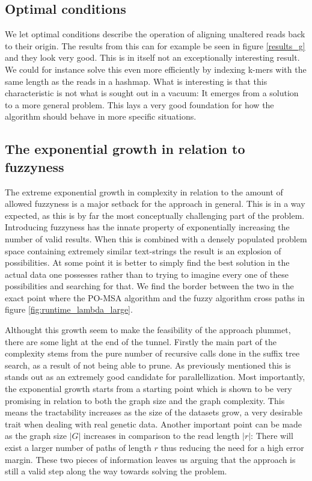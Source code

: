 \documentclass[thesis.tex]{subfiles}
\begin{document}
\subsection*{Optimal conditions}
We let optimal conditions describe the operation of aligning unaltered reads back to their origin. The results from this can for example be seen in figure \ref{results_g} and they look very good. This is in itself not an exceptionally interesting result. We could for instance solve this even more efficiently by indexing k-mers with the same length as the reads in a hashmap. What is interesting is that this characteristic is not what is sought out in a vacuum: It emerges from a solution to a more general problem. This lays a very good foundation for how the algorithm should behave in more specific situations. 
\subsection*{The exponential growth in relation to fuzzyness}
The extreme exponential growth in complexity in relation to the amount of allowed fuzzyness is a major setback for the approach in general. This is in a way expected, as this is by far the most conceptually challenging part of the problem. Introducing fuzzyness has the innate property of exponentially increasing the number of valid results. When this is combined with a densely populated problem space containing extremely similar text-strings the result is an explosion of possibilities. At some point it is better to simply find the best solution in the actual data one possesses rather than to trying to imagine every one of these possibilities and searching for that. We find the border between the two in the exact point where the PO-MSA algorithm and the fuzzy algorithm cross paths in figure \ref{fig:runtime_lambda_large}.\\
\par\noindent
Althought this growth seem to make the feasibility of the approach plummet, there are some light at the end of the tunnel. Firstly the main part of the complexity stems from the pure number of recursive calls done in the suffix tree search, as a result of not being able to prune. As previously mentioned this is stands out as an extremely good candidate for parallellization. Most importantly, the exponential growth starts from a starting point which is shown to be very promising in relation to both the graph size and the graph complexity. This means the tractability increases as the size of the datasets grow, a very desirable trait when dealing with real genetic data. Another important point can be made as the graph size $|G|$ increases in comparison to the read length $|r|$: There will exist a larger number of paths of length $r$ thus reducing the need for a high error margin. These two pieces of information leaves us arguing that the approach is still a valid step along the way towards solving the problem.
\end{document}
